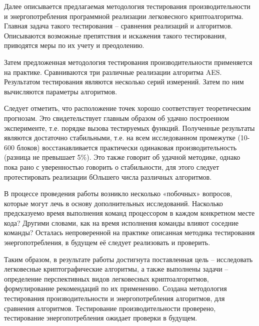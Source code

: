 Далее описывается предлагаемая методология тестирования производительности и энергопотребления программной реализации легковесного криптоалгоритма. Главная задача такого тестирования – сравнения реализаций и алгоритмов. Описываются возможные препятствия и искажения такого тестирования, приводятся меры по их учету и преодолению. 

Затем предложенная методология тестирования производительности применяется на практике. Сравниваются три различные реализации алгоритма AES. Результатом тестирования являются несколько серий измерений. Затем по ним вычисляются параметры алгоритмов.

Следует отметить, что расположение точек хорошо соответствует теоретическим прогнозам. Это свидетельствует главным образом об удачно построенном эксперименте, т.е. порядке вызова тестируемых функций. Полученные результаты являются достаточно стабильными, т.е. на всем исследованном промежутке (10-600 блоков) восстанавливается практически одинаковая производительность (разница не превышает 5\%). Это также говорит об удачной методике, однако пока рано с уверенностью говорить о стабильности, для этого следует протестировать реализации бОльшего числа различных алгоритмов.

В процессе проведения работы возникло несколько «побочных» вопросов, которые могут лечь в основу дополнительных исследований. Насколько предсказуемо время выполнения команд процессором в каждом конкретном месте кода? Другими словами, как на время исполнения команды влияют соседние команды? Осталась непроверенной на практике описанная методика тестирования энергопотребления, в будущем её следует реализовать и проверить.

Таким образом, в результате работы достигнута поставленная цель – исследовать легковесные криптографические алгоритмы, а также выполнены задачи – определение перспективных видов легковесных криптоалгоритмов, формулирование рекомендаций по их применению. Создана методология тестирования производительности и энергопотребления алгоритмов, для сравнения алгоритмов. Тестирование производительности проверено, тестирование энергопотребления ожидает проверки в будущем.








